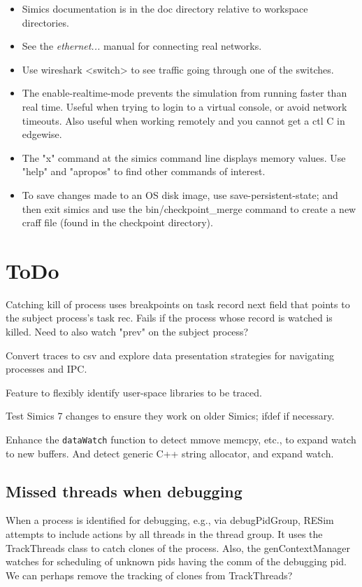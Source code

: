 \documentclass[titlepage]{article}
\begin{document}
\begin{itemize}
\item Simics documentation is in the doc directory relative to workspace directories.

\item See the \textit{ethernet...} manual for connecting real networks.

\item Use wireshark <switch> to see traffic going through one of the switches.

\item The enable-realtime-mode prevents the simulation from running faster than real time.  Useful when trying to login
to a virtual console, or avoid network timeouts.  Also useful when working remotely and you cannot get a ctl C in 
edgewise.

\item The "x" command at the simics command line displays memory values.  Use "help" and "apropos" to find other commands of interest.

\item To save changes made to an OS disk image, use save-persistent-state; and then exit simics and use the bin/checkpoint\_merge command
to create a new craff file (found in the checkpoint directory).
\end{itemize}

\section{ToDo}
Catching kill of process uses breakpoints on task record next field that points to the subject process's task rec.  Fails if the
process whose record is watched is killed.  Need to also watch "prev" on the subject process?

Convert traces to csv and explore data presentation strategies for navigating processes and IPC.

Feature to flexibly identify user-space libraries to be traced.

Test Simics 7 changes to ensure they work on older Simics; ifdef if necessary.

Enhance the {\tt dataWatch} function to detect mmove memcpy, etc., to expand watch to new buffers.
And detect generic C++ string allocator, and expand watch.

\subsection{Missed threads when debugging}
When a process is identified for debugging, e.g., via debugPidGroup, RESim attempts to include actions by all threads in the thread group.  It uses the
TrackThreads class to catch clones of the process.  Also, the genContextManager watches for scheduling of unknown pids having the comm of the debugging
pid.  We can perhaps remove the tracking of clones from TrackThreads?
\end{document}
